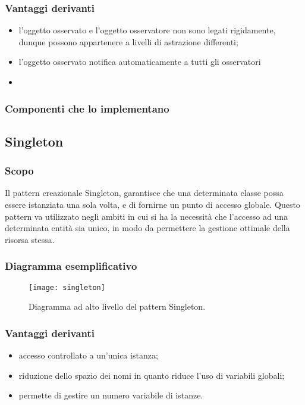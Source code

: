 \subsubsection{Vantaggi derivanti}
\begin{itemize}
\item l'oggetto osservato e l'oggetto osservatore non sono legati rigidamente, dunque possono appartenere a livelli di astrazione differenti;
\item l'oggetto osservato notifica automaticamente a tutti gli osservatori
\item 
\end{itemize}
\subsubsection{Componenti che lo implementano}
\item 

\subsection{Singleton}
\subsubsection{Scopo}
Il pattern creazionale Singleton, garantisce che una determinata classe possa essere istanziata una sola volta, e di fornirne un punto di accesso globale. Questo pattern va utilizzato negli ambiti in cui si ha la necessità che l'accesso ad una determinata entità sia unico, in modo da permettere la gestione ottimale della risorsa stessa.
\subsubsection{Diagramma esemplificativo}
\begin{figure}[h]
\centering
\texttt{[image: singleton]}
\caption{Diagramma ad alto livello del pattern Singleton.}\label{fig:singleton}
\end{figure}
\subsubsection{Vantaggi derivanti}
\begin{itemize}
\item accesso controllato a un'unica istanza;
\item riduzione dello spazio dei nomi in quanto riduce l'uso di variabili globali;
\item permette di gestire un numero variabile di istanze.
\end{itemize}
